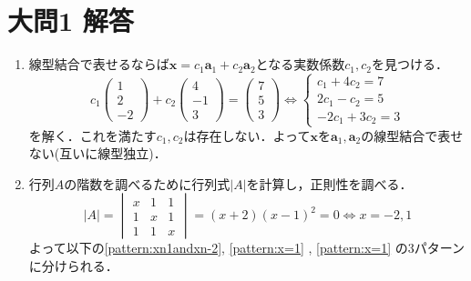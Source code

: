 \documentclass[dvipdfmx]{jsreport}
\begin{document}
\section{大問1 解答}
\begin{souanswer} %
\begin{enumerate}
	\item 線型結合で表せるならば$\bm{x}= c_1\bm{a}_1+ c_2\bm{a}_2$となる実数係数$c_1, c_2$を見つける．
\begin{equation*}
	c_1\begin{pmatrix}1\\ 2\\ -2\end{pmatrix}+ c_2\begin{pmatrix}4\\ -1\\ 3\end{pmatrix}= \begin{pmatrix}7\\ 5\\ 3\end{pmatrix}
	\iff
	\begin{cases}
		c_1+ 4c_2= 7\\
		2c_1- c_2= 5\\
		-2c_1+ 3c_2= 3
	\end{cases}
\end{equation*}
	を解く．これを満たす$c_1, c_2$は存在しない．よって$\bm{x}$を$\bm{a}_1, \bm{a}_2$の線型結合で表せない(互いに線型独立)．
	\item 行列$A$の階数を調べるために行列式$|A|$を計算し，正則性を調べる．
\begin{equation*}
	|A|= \begin{vmatrix}x& 1& 1\\ 1& x& 1\\ 1& 1& x\end{vmatrix}= (x+2)(x-1)^2= 0\iff x= -2, 1
\end{equation*}
	よって以下の\ref{pattern:xn1andxn-2}, \ref{pattern:x=1} , \ref{pattern:x=1} の3パターンに分けられる．
\end{enumerate}
\end{souanswer}
\end{document}
